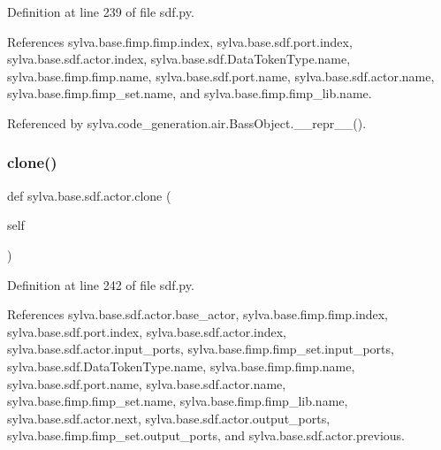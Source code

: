Definition at line 239 of file sdf.\+py.



References sylva.\+base.\+fimp.\+fimp.\+index, sylva.\+base.\+sdf.\+port.\+index, sylva.\+base.\+sdf.\+actor.\+index, sylva.\+base.\+sdf.\+Data\+Token\+Type.\+name, sylva.\+base.\+fimp.\+fimp.\+name, sylva.\+base.\+sdf.\+port.\+name, sylva.\+base.\+sdf.\+actor.\+name, sylva.\+base.\+fimp.\+fimp\+\_\+set.\+name, and sylva.\+base.\+fimp.\+fimp\+\_\+lib.\+name.



Referenced by sylva.\+code\+\_\+generation.\+air.\+Bass\+Object.\+\_\+\+\_\+repr\+\_\+\+\_\+().


\mbox{\label{classsylva_1_1base_1_1sdf_1_1actor_a366534a2c6988eb885d89b7259c5b411}} 
\subsubsection{\texorpdfstring{clone()}{clone()}}
{\footnotesize\ttfamily def sylva.\+base.\+sdf.\+actor.\+clone (\begin{DoxyParamCaption}\item[{}]{self }\end{DoxyParamCaption})}



Definition at line 242 of file sdf.\+py.



References sylva.\+base.\+sdf.\+actor.\+base\+\_\+actor, sylva.\+base.\+fimp.\+fimp.\+index, sylva.\+base.\+sdf.\+port.\+index, sylva.\+base.\+sdf.\+actor.\+index, sylva.\+base.\+sdf.\+actor.\+input\+\_\+ports, sylva.\+base.\+fimp.\+fimp\+\_\+set.\+input\+\_\+ports, sylva.\+base.\+sdf.\+Data\+Token\+Type.\+name, sylva.\+base.\+fimp.\+fimp.\+name, sylva.\+base.\+sdf.\+port.\+name, sylva.\+base.\+sdf.\+actor.\+name, sylva.\+base.\+fimp.\+fimp\+\_\+set.\+name, sylva.\+base.\+fimp.\+fimp\+\_\+lib.\+name, sylva.\+base.\+sdf.\+actor.\+next, sylva.\+base.\+sdf.\+actor.\+output\+\_\+ports, sylva.\+base.\+fimp.\+fimp\+\_\+set.\+output\+\_\+ports, and sylva.\+base.\+sdf.\+actor.\+previous.


